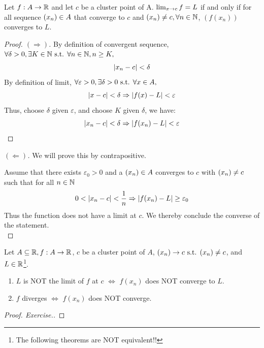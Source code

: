 \documentclass[a4paper,12pt]{article}
\begin{document}
\begin{theorem}
    Let \(f:A\rightarrow\mathbb{R}\) and let \(c \) be a cluster point of A. \(\lim_{x\rightarrow c } {f }=L\) if and only if 
    for all sequence \((x _{n })\in A\) that converge to \(c \) and \((x _{n })\neq c, \forall n \in \mathbb{N}\), 
    \((f(x_n))\) converges to \(L \).

    \begin{proof}[Proof. \((\Rightarrow)\)]
        By definition of convergent sequence, \(\forall \delta>0, \exists K\in\mathbb{N} \text{ s.t. } \forall n\in\mathbb{N}, n\ge K,\) 
        \[\left\lvert x_n-c\right\rvert<\delta\]
        By definition of limit, \(\forall \varepsilon>0, \exists \delta>0 \text{ s.t. } \forall x\in A,\) 
        \[\left\lvert x-c\right\rvert<\delta\Rightarrow\left\lvert f(x )-L\right\rvert<\varepsilon\]
        Thus, choose \(\delta\) given \(\varepsilon\), and choose \(K\) given \(\delta\), we have:
        \[\left\lvert x_n-c\right\rvert<\delta\Rightarrow\left\lvert f(x_n)-L\right\rvert<\varepsilon\]
    \end{proof}

    \begin{proof}[\((\Leftarrow)\)]
        We will prove this by contrapositive.

        Assume that there exists \(\varepsilon_0>0\) and a \((x _{n })\in A \) converges to \(c \) with \((x _{n })\neq c\) 
        such that for all \(n\in\mathbb{N}\)
        \[0<\left\lvert x_n-c\right\rvert<\frac{1}{n}\Rightarrow\left\lvert f(x_n)-L\right\rvert\ge\varepsilon_0\]
        Thus the function does not have a limit at \(c\). We thereby conclude the converse of the statement.\\
    \end{proof}

\end{theorem}

\begin{theorem}
    Let \(A\subseteq\mathbb{R},f:A\rightarrow\mathbb{R}\), \(c \) be a cluster point of \(A\), 
    \((x _{n })\rightarrow c\text{ s.t. }(x _{n })\neq c\), and \(L\in\mathbb{R}\)\footnote{The following theorems are NOT equivalent!!}.
    \begin{enumerate}
        \item \(L\) is NOT the limit of \(f\) at \(c\) \(\iff\) \(f(x_n)\) does NOT converge to \(L\).
        \item \(f\) diverges \(\iff\) \(f(x_n)\) does NOT converge.
    \end{enumerate}

    \begin{proof}[Proof. Exercise.]
    \end{proof}
\end{theorem}
\end{document}
